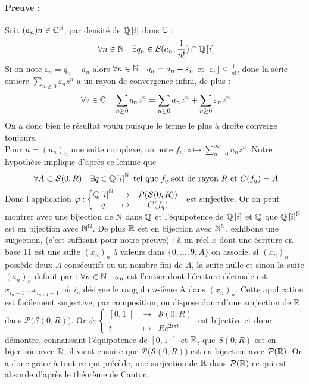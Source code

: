 \documentclass[letterpaper,10pt]{article}
\begin{document}
{\paragraph{Preuve :}
Soit $(a_n)n \in \mathbb{C}^{\mathbb{N}}$, par densité de $\mathbb{Q}\left[i\right]$ dans $\mathbb{C}$ :
 \[\ \forall n\in \mathbb{N}\quad   \exists q_n \in \mathcal{B}(a_n,\frac{1}{n!})\cap \mathbb{Q}\left[i\right] \] 
 Si on note $\varepsilon_n = q_n-a_n$ alors $\forall n\in \mathbb{N} \quad   q_n = a_n + \varepsilon_n$ et $ |\varepsilon_n| \leq \frac{1}{n!} $,
  donc la série entiere $\sum_{n\geq 0}\varepsilon_nz^n$ a un rayon de convergence infini, de plus : \[\ \forall z \in \mathbb{C} \quad \sum_{n\geq 0} q_nz^n =\sum_{n\geq 0} a_nz^n +\sum_{n\geq 0} \varepsilon_nz^n\] On a donc bien le résultat voulu puisque le terme le plus à droite converge toujours.\; ${\square}$\\
Pour $u = (u_n)_n$ une suite complexe, on note $f_u:z\mapsto \sum_{n = 0}^{\infty}u_nz^n$.
Notre hypothèse implique d'après ce lemme que \[\ \forall A \subset \mathcal{S}(0,R) \quad \exists q \in \mathbb{Q}\left[i\right]^{\mathbb{N}} \text{ tel que }  
f_q \text{ soit de rayon $R$ et } C(f_q) = A \]
 Donc l'application $ \varphi : \left\{\begin{matrix} \mathbb{Q}\left[i\right]^{\mathbb{N}} &\to & \mathcal{P(S(}0,R)) \\ q &\mapsto & C(f_q) \end{matrix} \right. \;\;$
  est surjective. Or on peut montrer avec une bijection de $\mathbb{N}$ dans $\mathbb{Q}$ et l'équipotence de $\mathbb{Q}\left[i\right] $ 
  et $\mathbb{Q}$ que $\mathbb{Q}\left[i\right]^{\mathbb{N}}$ est en bijection avec $\mathbb{N}^{\mathbb{N}}$. De plus $\mathbb{R}$ est en bijection avec 
  $\mathbb{N}^{\mathbb{N}}$, exhibons une surjection, (c'est suffisant pour notre preuve) : à un réel $x$ dont une écriture en base 11 est une suite $(x_n)_n$
   à valeurs dans $\{0,\ldots ,9,A\} $ on associe, si $(x_n)_n$ possède deux $A$ consécutifs ou un nombre fini de $A$, la suite nulle et sinon la suite 
   $(a_n)_n$ definit par : $\forall n \in \mathbb{N}\quad a_n $ est l'entier dont l'écriture décimale est $x_{i_n +1} \ldots x_{i_{n+1}-1}$ où $i_n$ désigne le rang du $n$-ième A dans $(x_n)_n $. Cette application est facilement surjective, par composition, on dispose donc d'une surjection de $\mathbb{R}$ dans $\mathcal{P(S}(0,R))$. Or $\psi :\left\{\begin{matrix} \left[0,1\right[ & \to & \mathcal{S}(0,R) \\ t &\mapsto & Re^{2i\pi t}\end{matrix}\right. $ est bijective et donc démontre, connaissant l'équipotence de $\left[0,1\right[$ et $\mathbb{R}$, que $S(0,R)$ est en bijection avec $\mathbb{R}$, il vient ensuite que $\mathcal{P(S}(0,R))$ est en bijection avec $\mathcal{P}(\mathbb{R})$. On a donc grace à tout ce qui précède, une surjection de $\mathbb{R}$ dans $\mathcal{P}(\mathbb{R})$ ce qui est absurde d'après le théorème de Cantor.

}
\end{document}
